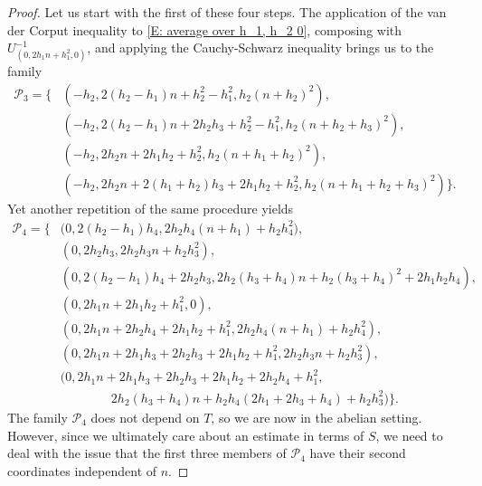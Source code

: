 \documentclass[11pt]{amsart}
\theoremstyle{definition}
\newcommand{\CP}{{\mathcal P}}
\newcommand{\eps}{\epsilon}
\newcommand{\inv}{^{-1}}
\newcommand{\1}{{\mathbf{1}}}
\begin{document}
\begin{proof}
    Let us start with the first of these four steps. The application of the van der Corput inequality to \eqref{E: average over h_1, h_2 0}, composing with $U_{(0, 2h_1n+h_1^2, 0)}\inv$, and applying the Cauchy-Schwarz inequality brings us to the family
    \begin{align*}
        \CP_3 = \{&(-h_2, 2(h_2-h_1)n+h_2^2-h_1^2,h_2(n+h_2)^2),\\ 
        &(-h_2, 2(h_2-h_1)n+2h_2h_3+h_2^2-h_1^2, h_2(n+h_2+h_3)^2),\\ 
        &(-h_2, 2h_2n+2h_1h_2+h_2^2, h_2(n+h_1+h_2)^2),\\ 
        &(-h_2, 2h_2n+2(h_1+h_2)h_3+2h_1h_2+h_2^2, h_2(n+h_1+h_2+h_3)^2)\}.
    \end{align*}
    Yet another repetition of the same procedure yields
    \begin{align*}
        \CP_4 = \{&({0,2(h_2-h_1)h_4, 2h_2h_4(n+h_1) + h_2h_4^2),}\\
        &{(0, 2h_2h_3, 2h_2h_3n + h_2 h_3^2),}\\
        &{(0, 2(h_2-h_1)h_4 + 2h_2h_3, 2h_2(h_3+h_4)n + h_2 (h_3+h_4)^2+2h_1h_2h_4),}\\
        &(0, 2h_1n+2h_1h_2+h_1^2,0),\\ 
        &(0,2h_1n+2h_2h_4+2h_1h_2+h_1^2, 2h_2h_4(n+h_1)+h_2h_4^2),\\ 
        &(0, 2h_1n+2h_1h_3+2h_2h_3+2h_1h_2+h_1^2,2h_2h_3n + h_2h_3^2),\\ 
        &(0, 2h_1n+2h_1h_3+2h_2h_3+2h_1h_2+2h_2h_4+h_1^2,\\
        &\qquad\qquad 2h_2(h_3+h_4)n+h_2h_4(2h_1+2h_3+h_4)+h_2h_3^2)\}.
    \end{align*}
    The family $\CP_4$ does not depend on $T$, so we are now in the abelian setting. However, since we ultimately care about an estimate in terms of $S$, we need to deal with the issue that the first three members of $\CP_4$ have their second coordinates independent of $n$. 
    

\end{proof}
\end{document}
